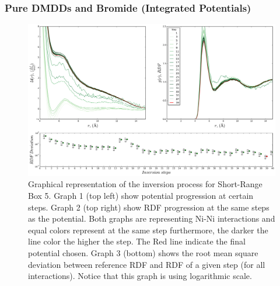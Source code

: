 \documentclass[10pt,a4paper,twoside]{article}
\begin{document}
\subsubsection{Pure DMDDs and Bromide (Integrated Potentials)}

\begin{figure}[H]
  \begin{center}
	\includegraphics[width=.8 \textwidth]{./graphs/Conv45sN}
	\caption{\small{Graphical representation of the inversion process for Short-Range Box 5. Graph 1 (top left) show potential progression at certain steps. Graph 2 (top right) show RDF progression at the same steps as the potential. Both graphs are representing Ni-Ni interactions and equal colors represent at the same step furthermore, the darker the line color the higher the step. The Red line indicate the final potential chosen.  Graph 3 (bottom) shows the root mean square deviation between reference RDF and RDF of a given step (for all interactions). Notice that this graph is using logarithmic scale.}}
	\label{Fig:Conv45sN}
  \end{center}
\end{figure}
\end{document}
